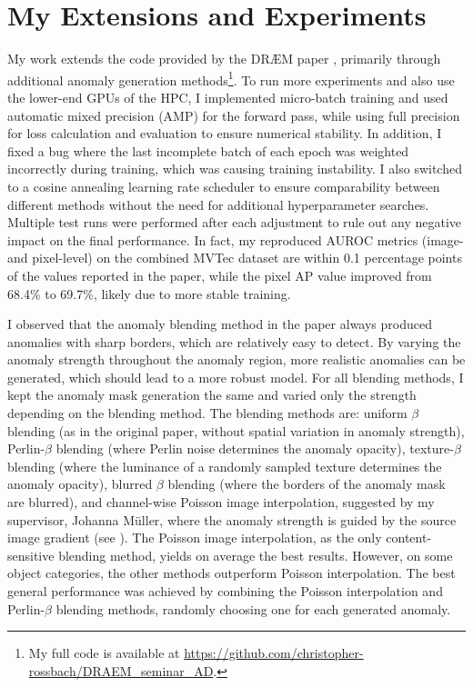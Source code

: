 \chapter*{My Extensions and Experiments}
My work extends the code provided by the DRÆM paper \citep{zavrtanikDRAEMDiscriminativelyTrained2021}, primarily through additional anomaly generation methods\footnote{My full code is available at \url{https://github.com/christopher-rossbach/DRAEM_seminar_AD}.}.
To run more experiments and also use the lower-end GPUs of the HPC, I implemented micro-batch training and used automatic mixed precision (AMP) for the forward pass, while using full precision for loss calculation and evaluation to ensure numerical stability.
In addition, I fixed a bug where the last incomplete batch of each epoch was weighted incorrectly during training, which was causing training instability.
I also switched to a cosine annealing learning rate scheduler to ensure comparability between different methods without the need for additional hyperparameter searches.
Multiple test runs were performed after each adjustment to rule out any negative impact on the final performance.
In fact, my reproduced AUROC metrics (image- and pixel-level) on the combined MVTec dataset are within 0.1 percentage points of the values reported in the paper, while the pixel AP value improved from 68.4\% to 69.7\%, likely due to more stable training.


I observed that the anomaly blending method in the paper always produced anomalies with sharp borders, which are relatively easy to detect.
By varying the anomaly strength throughout the anomaly region, more realistic anomalies can be generated, which should lead to a more robust model.
For all blending methods, I kept the anomaly mask generation the same and varied only the strength depending on the blending method.
The blending methods are: uniform $\beta$ blending (as in the original paper, without spatial variation in anomaly strength), Perlin-$\beta$ blending (where Perlin noise determines the anomaly opacity), texture-$\beta$ blending (where the luminance of a randomly sampled texture determines the anomaly opacity), blurred $\beta$ blending (where the borders of the anomaly mask are blurred), and channel-wise Poisson image interpolation, suggested by my supervisor, Johanna Müller, where the anomaly strength is guided by the source image gradient (see \citet{tanDetectingOutliersPoisson2021}).
The Poisson image interpolation, as the only content-sensitive blending method, yields on average the best results.
However, on some object categories, the other methods outperform Poisson interpolation.
The best general performance was achieved by combining the Poisson interpolation and Perlin-$\beta$ blending methods, randomly choosing one for each generated anomaly.

